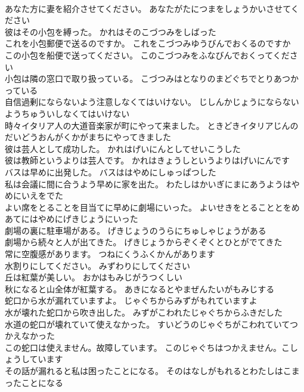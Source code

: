 \documentclass[8pt]{extreport}
\begin{document}
\begin{CJK}{UTF8}{min}
\\	あなた方に妻を紹介させてください。	あなたがたにつまをしょうかいさせてください 
\\	彼はその小包を縛った。	かれはそのこづつみをしばった 
\\	これを小包郵便で送るのですか。	これをこづつみゆうびんでおくるのですか 
\\	この小包を船便で送ってください。	このこづつみをふなびんでおくってください 
\\	小包は隣の窓口で取り扱っている。	こづつみはとなりのまどぐちでとりあつかっている 
\\	自信過剰にならないよう注意しなくてはいけない。	じしんかじょうにならないようちゅういしなくてはいけない 
\\	時々イタリア人の大道音楽家が町にやって来ました。	ときどきイタリアじんのだいどうおんがくかがまちにやってきました 
\\	彼は芸人として成功した。	かれはげいにんとしてせいこうした 
\\	彼は教師というよりは芸人です。	かれはきょうしというよりはげいにんです 
\\	バスは早めに出発した。	バスははやめにしゅっぱつした 
\\	私は会議に間に合うよう早めに家を出た。	わたしはかいぎにまにあうようはやめにいえをでた 
\\	よい席をとることを目当てに早めに劇場にいった。	よいせきをとることとをめあてにはやめにげきじょうにいった 
\\	劇場の裏に駐車場がある。	げきじょうのうらにちゅしゃじょうがある 
\\	劇場から続々と人が出てきた。	げきじょうからぞくぞくとひとがでてきた 
\\	常に空腹感があります。	つねにくうふくかんがあります 
\\	水割りにしてください。	みずわりにしてください 
\\	丘は紅葉が美しい。	おかはもみじがうつくしい 
\\	秋になると山全体が紅葉する。	あきになるとやまぜんたいがもみじする 
\\	蛇口から水が漏れていますよ。	じゃぐちからみずがもれていますよ 
\\	水が壊れた蛇口から吹き出した。	みずがこわれたじゃぐちからふきだした 
\\	水道の蛇口が壊れていて使えなかった。	すいどうのじゃぐちがこわれていてつかえなかった 
\\	この蛇口は使えません。故障しています。	このじゃぐちはつかえません。こしょうしています 
\\	その話が漏れると私は困ったことになる。	そのはなしがもれるとわたしはこまったことになる 

\end{CJK}
\end{document}
